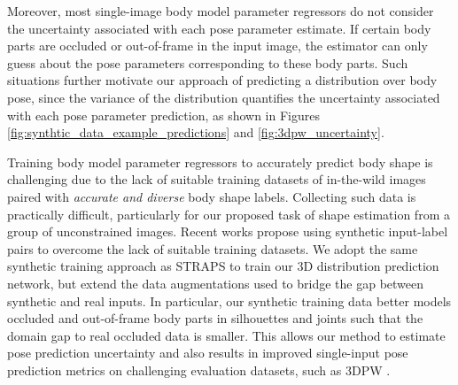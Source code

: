 \documentclass[final]{cvpr}
\begin{document}
Moreover, most single-image body model parameter regressors \cite{hmrKanazawa17,kolotouros2019spin,omran2018nbf,zhang2019danet,STRAPS2020BMVC,Xu_2019_ICCV, georgakis2020hkmr} do not consider the uncertainty associated with each pose parameter estimate. If certain body parts are occluded or out-of-frame in the input image, the estimator can only guess about the pose parameters corresponding to these body parts. Such situations further motivate our approach of predicting a distribution over body pose, since the variance of the distribution quantifies the uncertainty associated with each pose parameter prediction, as shown in Figures \ref{fig:synthtic_data_example_predictions} and \ref{fig:3dpw_uncertainty}.

Training body model parameter regressors to accurately predict body shape is challenging due to the lack of suitable training datasets of in-the-wild images paired with \textit{accurate and diverse} body shape labels. Collecting such data is practically difficult, particularly for our proposed task of shape estimation from a group of unconstrained images. Recent works \cite{STRAPS2020BMVC, smith20193dfromsilhouettes, varol17_surreal} propose using synthetic input-label pairs to overcome the lack of suitable training datasets. We adopt the same synthetic training approach as STRAPS \cite{STRAPS2020BMVC} to train our 3D distribution prediction network, but extend the data augmentations used to bridge the gap between synthetic and real inputs. In particular, our synthetic training data better models occluded and out-of-frame body parts in silhouettes and joints such that the domain gap to real occluded data is smaller. This allows our method to estimate pose prediction uncertainty and also results in improved single-input pose prediction metrics on challenging evaluation datasets, such as 3DPW \cite{vonMarcard2018}.
\end{document}
